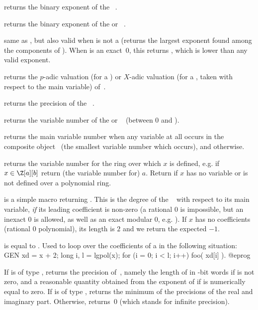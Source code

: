  returns the binary exponent of the
~.

 returns the binary exponent of the 
or ~.

 same as , but also valid when 
is not a  (returns the largest exponent found among the components
of ). When  is an exact~0, this returns
\hbox{}, which is lower than any valid exponent.

 returns the $p$-adic valuation (for
a ) or $X$-adic valuation (for a , taken with respect to
the main variable) of~.

 returns the precision of the ~.

 returns the variable number of the
 or ~ (between 0 and ).

 returns the main variable number when any variable
at all occurs in the composite object~ (the smallest variable number
which occurs), and  otherwise.

 returns the variable number for the ring over which
$x$ is defined, e.g. if $x\in \Z[a][b]$ return (the variable number for)
$a$. Return  if $x$ has no variable or is not defined over a
polynomial ring.

 is a simple macro returning .
This is the degree of the ~ with respect to its main
variable, \emph{if} its leading coefficient is non-zero (a rational $0$ is
impossible, but an inexact $0$ is allowed, as well as an exact modular $0$,
e.g. ). If $x$ has no coefficients (rational $0$ polynomial),
its length is $2$ and we return the expected $-1$.

 is equal to . Used to loop over
the coefficients of a  in the following situation:
\bprog
    GEN xd = x + 2;
    long i, l = lgpol(x);
    for (i = 0; i < l; i++) foo( xd[i] ).
@eprog

 If  is of type , returns the
precision of~, namely the length of  in \B-bit words if 
is not zero, and a reasonable quantity obtained from the exponent of 
if  is numerically equal to zero. If  is of type
, returns the minimum of the precisions of the real and
imaginary part. Otherwise, returns~0 (which stands for infinite precision).

